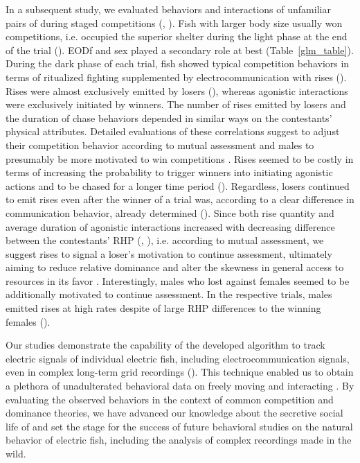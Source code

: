 In a subsequent study, we evaluated behaviors and interactions of unfamiliar pairs of \lepto{} during staged competitions (, \citealp{Raab2021}). Fish with larger body size usually won competitions, i.e. occupied the superior shelter during the light phase at the end of the trial (). EODf and sex played a secondary role at best (Table~\ref{glm_table}). During the dark phase of each trial, fish showed typical competition behaviors in terms of ritualized fighting supplemented by electrocommunication with rises (). Rises were almost exclusively emitted by losers (), whereas agonistic interactions were exclusively initiated by winners. The number of rises emitted by losers and the duration of chase behaviors depended in similar ways on the contestants' physical attributes. Detailed evaluations of these correlations suggest \lepto{} to adjust their competition behavior according to mutual assessment \citep{EnquistLeimar1987} and males to presumably be more motivated to win competitions \citep{ArnottElwood2008}. Rises seemed to be costly in terms of increasing the probability to trigger winners into initiating agonistic actions and to be chased for a longer time period (). Regardless, losers continued to emit rises even after the winner of a trial was, according to a clear difference in communication behavior, already determined (). Since both rise quantity and average duration of agonistic interactions increased with decreasing difference between the contestants' RHP (, ), i.e. according to mutual assessment, we suggest rises to signal a loser's motivation to continue assessment, ultimately aiming to reduce relative dominance and alter the skewness in general access to resources in its favor \citep{Sapolsky2005}. Interestingly, males who lost against females seemed to be additionally motivated to continue assessment. In the respective trials, males emitted rises at high rates despite of large RHP differences to the winning females ().

Our studies demonstrate the capability of the developed algorithm to track electric signals of individual electric fish, including electrocommunication signals, even in complex long-term grid recordings (). This technique enabled us to obtain a plethora of unadulterated behavioral data on freely moving and interacting \lepto{}. By evaluating the observed behaviors in the context of common competition and dominance theories, we have advanced our knowledge about the secretive social life of \lepto{} and set the stage for the success of future behavioral studies on the natural behavior of electric fish, including the analysis of complex recordings made in the wild. 

